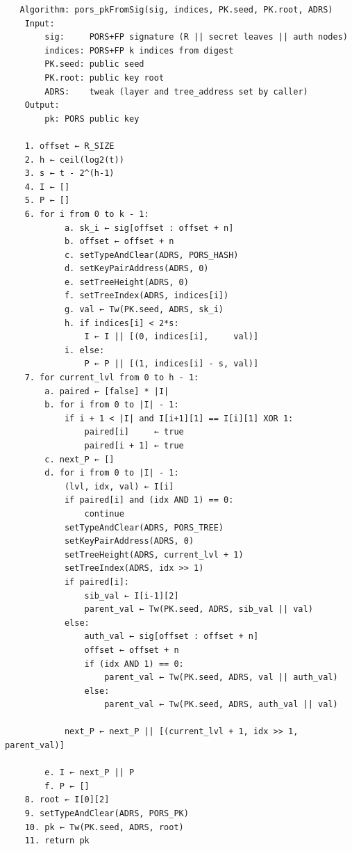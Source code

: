 \begin{verbatim}
   Algorithm: pors_pkFromSig(sig, indices, PK.seed, PK.root, ADRS)
    Input:
        sig:     PORS+FP signature (R || secret leaves || auth nodes)
        indices: PORS+FP k indices from digest
        PK.seed: public seed
        PK.root: public key root
        ADRS:    tweak (layer and tree_address set by caller)   
    Output:
        pk: PORS public key

    1. offset ← R_SIZE
    2. h ← ceil(log2(t))
    3. s ← t - 2^(h-1)
    4. I ← []
    5. P ← []
    6. for i from 0 to k - 1:
            a. sk_i ← sig[offset : offset + n]
            b. offset ← offset + n
            c. setTypeAndClear(ADRS, PORS_HASH)
            d. setKeyPairAddress(ADRS, 0)
            e. setTreeHeight(ADRS, 0)
            f. setTreeIndex(ADRS, indices[i])
            g. val ← Tw(PK.seed, ADRS, sk_i)
            h. if indices[i] < 2*s:
                I ← I || [(0, indices[i],     val)]
            i. else:
                P ← P || [(1, indices[i] - s, val)]
    7. for current_lvl from 0 to h - 1:
        a. paired ← [false] * |I|
        b. for i from 0 to |I| - 1:
            if i + 1 < |I| and I[i+1][1] == I[i][1] XOR 1:
                paired[i]     ← true
                paired[i + 1] ← true
        c. next_P ← []
        d. for i from 0 to |I| - 1:
            (lvl, idx, val) ← I[i]
            if paired[i] and (idx AND 1) == 0:
                continue                 
            setTypeAndClear(ADRS, PORS_TREE)
            setKeyPairAddress(ADRS, 0)
            setTreeHeight(ADRS, current_lvl + 1)
            setTreeIndex(ADRS, idx >> 1)    
            if paired[i]: 
                sib_val ← I[i-1][2]
                parent_val ← Tw(PK.seed, ADRS, sib_val || val)
            else:
                auth_val ← sig[offset : offset + n]
                offset ← offset + n
                if (idx AND 1) == 0:
                    parent_val ← Tw(PK.seed, ADRS, val || auth_val)
                else:
                    parent_val ← Tw(PK.seed, ADRS, auth_val || val)
            
            next_P ← next_P || [(current_lvl + 1, idx >> 1, parent_val)]

        e. I ← next_P || P
        f. P ← []
    8. root ← I[0][2]
    9. setTypeAndClear(ADRS, PORS_PK)
    10. pk ← Tw(PK.seed, ADRS, root)
    11. return pk
\end{verbatim}